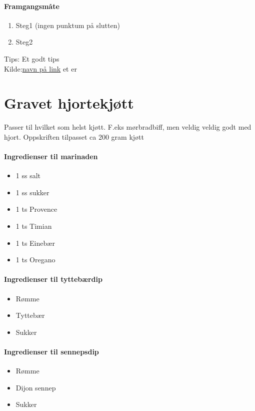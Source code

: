 \documentclass[12pt,a4paper]{book}
\begin{document}
\paragraph{Framgangsmåte}
\begin{enumerate}[noitemsep]
	\item Steg1 (ingen punktum på slutten)
	\item Steg2
\end{enumerate}

Tips: Et godt tips \\

Kilde:\href{https://link}{navn på link}
et er
\clearpage{}
\clearpage{}\section{﻿Gravet hjortekjøtt}
Passer til hvilket som helst kjøtt. F.eks mørbradbiff, men veldig veldig godt med hjort.
Oppskriften tilpasset ca 200 gram kjøtt

\paragraph{Ingredienser til marinaden}
\begin{itemize}[noitemsep]
	\item 1 ss salt
	\item 1 ss sukker
	\item 1 ts Provence
	\item 1 ts Timian
	\item 1 ts Einebær
	\item 1 ts Oregano
\end{itemize}

\paragraph{Ingredienser til tyttebærdip}
\begin{itemize}[noitemsep]
	\item Rømme
	\item Tyttebær
	\item Sukker
\end{itemize}

\paragraph{Ingredienser til sennepsdip}
\begin{itemize}[noitemsep]
	\item Rømme
	\item Dijon sennep
	\item Sukker
\end{itemize}
\end{document}
